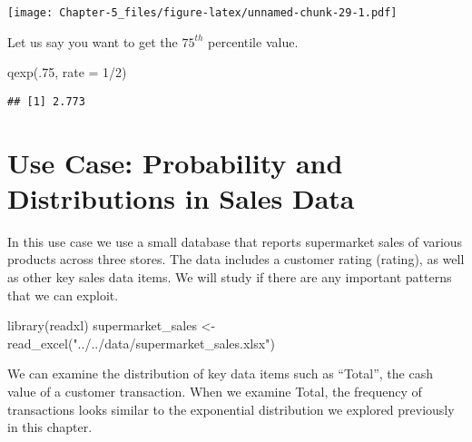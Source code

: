 \documentclass[
]{article}
\newenvironment{Shaded}{\begin{snugshade}}{\end{snugshade}}
\newcommand{\AttributeTok}[1]{\textcolor[rgb]{0.77,0.63,0.00}{#1}}
\newcommand{\DecValTok}[1]{\textcolor[rgb]{0.00,0.00,0.81}{#1}}
\newcommand{\FunctionTok}[1]{\textcolor[rgb]{0.00,0.00,0.00}{#1}}
\newcommand{\NormalTok}[1]{#1}
\newcommand{\OtherTok}[1]{\textcolor[rgb]{0.56,0.35,0.01}{#1}}
\newcommand{\SpecialCharTok}[1]{\textcolor[rgb]{0.00,0.00,0.00}{#1}}
\newcommand{\StringTok}[1]{\textcolor[rgb]{0.31,0.60,0.02}{#1}}
\begin{document}
\texttt{[image: Chapter-5\_files/figure-latex/unnamed-chunk-29-1.pdf]}

Let us say you want to get the \(75^{th}\) percentile value.

\begin{Shaded}
\begin{Highlighting}[]
\FunctionTok{qexp}\NormalTok{(.}\DecValTok{75}\NormalTok{, }\AttributeTok{rate =} \DecValTok{1}\SpecialCharTok{/}\DecValTok{2}\NormalTok{)}
\end{Highlighting}
\end{Shaded}

\begin{verbatim}
## [1] 2.773
\end{verbatim}

\hypertarget{use-case-probability-and-distributions-in-sales-data}{%
\section{Use Case: Probability and Distributions in Sales
Data}\label{use-case-probability-and-distributions-in-sales-data}}

In this use case we use a small database that reports supermarket sales
of various products across three stores. The data includes a customer
rating (rating), as well as other key sales data items. We will study if
there are any important patterns that we can exploit.

\begin{Shaded}
\begin{Highlighting}[]
\FunctionTok{library}\NormalTok{(readxl)}
\NormalTok{supermarket\_sales }\OtherTok{\textless{}{-}} \FunctionTok{read\_excel}\NormalTok{(}\StringTok{"../../data/supermarket\_sales.xlsx"}\NormalTok{)}
\end{Highlighting}
\end{Shaded}

We can examine the distribution of key data items such as ``Total'', the
cash value of a customer transaction. When we examine Total, the
frequency of transactions looks similar to the exponential distribution
we explored previously in this chapter.

\begin{Shaded}
\end{Shaded}
\end{document}

